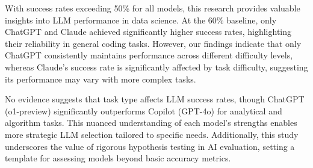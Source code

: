 \documentclass[conference]{IEEEtran}
\begin{document}
With success rates exceeding 50\% for all models, this research provides valuable insights into LLM performance in data science. At the 60\% baseline, only ChatGPT and Claude achieved significantly higher success rates, highlighting their reliability in general coding tasks. However, our findings indicate that only ChatGPT consistently maintains performance across different difficulty levels, whereas Claude's success rate is significantly affected by task difficulty, suggesting its performance may vary with more complex tasks.

No evidence suggests that task type affects LLM success rates, though ChatGPT (o1-preview) significantly outperforms Copilot (GPT-4o) for analytical and algorithm tasks. This nuanced understanding of each model's strengths enables more strategic LLM selection tailored to specific needs. Additionally, this study underscores the value of rigorous hypothesis testing in AI evaluation, setting a template for assessing models beyond basic accuracy metrics.




\end{document}

